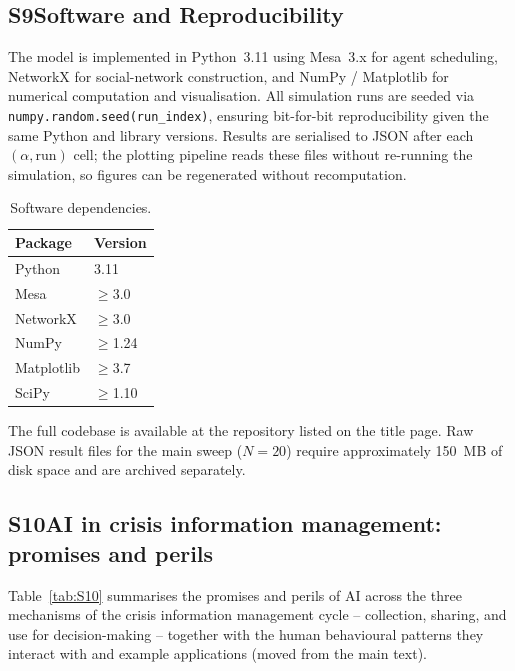 \subsection*{S9\quad Software and Reproducibility}

The model is implemented in Python~3.11 using Mesa~3.x for agent scheduling,
NetworkX for social-network construction, and NumPy / Matplotlib for numerical
computation and visualisation.
All simulation runs are seeded via \texttt{numpy.random.seed(run\_index)},
ensuring bit-for-bit reproducibility given the same Python and library versions.
Results are serialised to JSON after each $(\alpha,\mathrm{run})$ cell; the
plotting pipeline reads these files without re-running the simulation, so figures
can be regenerated without recomputation.

\begin{table}[h]
\centering
\caption{Software dependencies.}
\label{tab:S9}
\begin{tabular}{ll}
\toprule
Package & Version \\
\midrule
Python     & 3.11 \\
Mesa       & $\geq$3.0 \\
NetworkX   & $\geq$3.0 \\
NumPy      & $\geq$1.24 \\
Matplotlib & $\geq$3.7 \\
SciPy      & $\geq$1.10 \\
\bottomrule
\end{tabular}
\end{table}

The full codebase is available at the repository listed on the title page.
Raw JSON result files for the main sweep ($N=20$) require approximately 150~MB
of disk space and are archived separately.

\subsection*{S10\quad AI in crisis information management: promises and perils}

Table~\ref{tab:S10} summarises the promises and perils of AI across the three
mechanisms of the crisis information management cycle -- collection, sharing,
and use for decision-making -- together with the human behavioural patterns
they interact with and example applications (moved from the main text).

